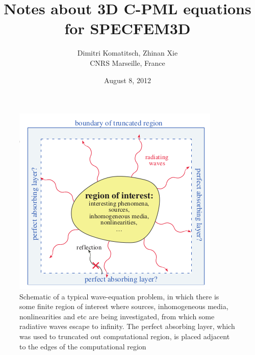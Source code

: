 \documentclass[onecolumn,extra]{gji_modified_cours_UPPA}
\begin{document}
\title{Notes about 3D C-PML equations for SPECFEM3D}
%
\author[Dimitri Komatitsch, Zhinan Xie]{Dimitri Komatitsch, Zhinan Xie\\
CNRS Marseille, France}
%
\date{August 8, 2012}

\maketitle

\begin{figure}
\includegraphics[scale=0.5]{pml_schematic.png}
\caption{Schematic of a typical wave-equation problem, in which there is some finite region of interest where sources,
inhomogeneous media, nonlinearities and etc are being investigated, from which some radiative waves escape to infinity.
The perfect absorbing layer, which was used to truncated out computational region, is placed adjacent to the edges of the
computational region}
\end{figure}
\end{document}
